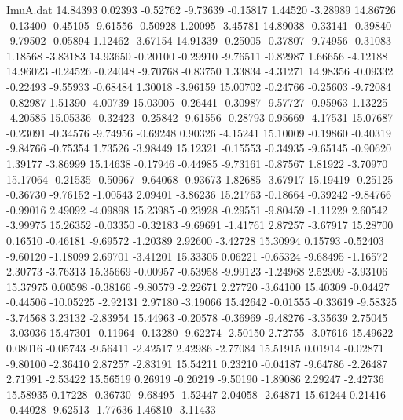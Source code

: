 \begin{filecontents}{ImuA.dat}
  14.84393    0.02393   -0.52762   -9.73639   -0.15817    1.44520   -3.28989
  14.86726   -0.13400   -0.45105   -9.61556   -0.50928    1.20095   -3.45781
  14.89038   -0.33141   -0.39840   -9.79502   -0.05894    1.12462   -3.67154
  14.91339   -0.25005   -0.37807   -9.74956   -0.31083    1.18568   -3.83183
  14.93650   -0.20100   -0.29910   -9.76511   -0.82987    1.66656   -4.12188
  14.96023   -0.24526   -0.24048   -9.70768   -0.83750    1.33834   -4.31271
  14.98356   -0.09332   -0.22493   -9.55933   -0.68484    1.30018   -3.96159
  15.00702   -0.24766   -0.25603   -9.72084   -0.82987    1.51390   -4.00739
  15.03005   -0.26441   -0.30987   -9.57727   -0.95963    1.13225   -4.20585
  15.05336   -0.32423   -0.25842   -9.61556   -0.28793    0.95669   -4.17531
  15.07687   -0.23091   -0.34576   -9.74956   -0.69248    0.90326   -4.15241
  15.10009   -0.19860   -0.40319   -9.84766   -0.75354    1.73526   -3.98449
  15.12321   -0.15553   -0.34935   -9.65145   -0.90620    1.39177   -3.86999
  15.14638   -0.17946   -0.44985   -9.73161   -0.87567    1.81922   -3.70970
  15.17064   -0.21535   -0.50967   -9.64068   -0.93673    1.82685   -3.67917
  15.19419   -0.25125   -0.36730   -9.76152   -1.00543    2.09401   -3.86236
  15.21763   -0.18664   -0.39242   -9.84766   -0.99016    2.49092   -4.09898
  15.23985   -0.23928   -0.29551   -9.80459   -1.11229    2.60542   -3.99975
  15.26352   -0.03350   -0.32183   -9.69691   -1.41761    2.87257   -3.67917
  15.28700    0.16510   -0.46181   -9.69572   -1.20389    2.92600   -3.42728
  15.30994    0.15793   -0.52403   -9.60120   -1.18099    2.69701   -3.41201
  15.33305    0.06221   -0.65324   -9.68495   -1.16572    2.30773   -3.76313
  15.35669   -0.00957   -0.53958   -9.99123   -1.24968    2.52909   -3.93106
  15.37975    0.00598   -0.38166   -9.80579   -2.22671    2.27720   -3.64100
  15.40309   -0.04427   -0.44506  -10.05225   -2.92131    2.97180   -3.19066
  15.42642   -0.01555   -0.33619   -9.58325   -3.74568    3.23132   -2.83954
  15.44963   -0.20578   -0.36969   -9.48276   -3.35639    2.75045   -3.03036
  15.47301   -0.11964   -0.13280   -9.62274   -2.50150    2.72755   -3.07616
  15.49622    0.08016   -0.05743   -9.56411   -2.42517    2.42986   -2.77084
  15.51915    0.01914   -0.02871   -9.80100   -2.36410    2.87257   -2.83191
  15.54211    0.23210   -0.04187   -9.64786   -2.26487    2.71991   -2.53422
  15.56519    0.26919   -0.20219   -9.50190   -1.89086    2.29247   -2.42736
  15.58935    0.17228   -0.36730   -9.68495   -1.52447    2.04058   -2.64871
  15.61244    0.21416   -0.44028   -9.62513   -1.77636    1.46810   -3.11433

\end{filecontents}
